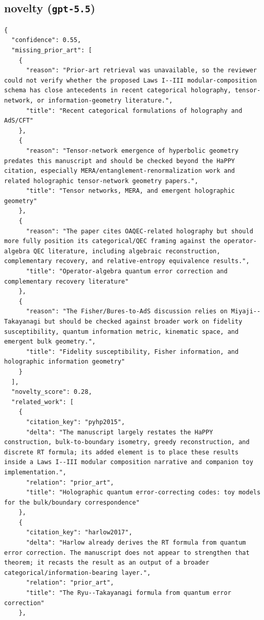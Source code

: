 \documentclass[11pt]{article}
\begin{document}
\subsection*{novelty (\texttt{gpt-5.5})}
\begin{verbatim}
{
  "confidence": 0.55,
  "missing_prior_art": [
    {
      "reason": "Prior-art retrieval was unavailable, so the reviewer could not verify whether the proposed Laws I--III modular-composition schema has close antecedents in recent categorical holography, tensor-network, or information-geometry literature.",
      "title": "Recent categorical formulations of holography and AdS/CFT"
    },
    {
      "reason": "Tensor-network emergence of hyperbolic geometry predates this manuscript and should be checked beyond the HaPPY citation, especially MERA/entanglement-renormalization work and related holographic tensor-network geometry papers.",
      "title": "Tensor networks, MERA, and emergent holographic geometry"
    },
    {
      "reason": "The paper cites OAQEC-related holography but should more fully position its categorical/QEC framing against the operator-algebra QEC literature, including algebraic reconstruction, complementary recovery, and relative-entropy equivalence results.",
      "title": "Operator-algebra quantum error correction and complementary recovery literature"
    },
    {
      "reason": "The Fisher/Bures-to-AdS discussion relies on Miyaji--Takayanagi but should be checked against broader work on fidelity susceptibility, quantum information metric, kinematic space, and emergent bulk geometry.",
      "title": "Fidelity susceptibility, Fisher information, and holographic information geometry"
    }
  ],
  "novelty_score": 0.28,
  "related_work": [
    {
      "citation_key": "pyhp2015",
      "delta": "The manuscript largely restates the HaPPY construction, bulk-to-boundary isometry, greedy reconstruction, and discrete RT formula; its added element is to place these results inside a Laws I--III modular composition narrative and companion toy implementation.",
      "relation": "prior_art",
      "title": "Holographic quantum error-correcting codes: toy models for the bulk/boundary correspondence"
    },
    {
      "citation_key": "harlow2017",
      "delta": "Harlow already derives the RT formula from quantum error correction. The manuscript does not appear to strengthen that theorem; it recasts the result as an output of a broader categorical/information-bearing layer.",
      "relation": "prior_art",
      "title": "The Ryu--Takayanagi formula from quantum error correction"
    },

\end{verbatim}
\end{document}
